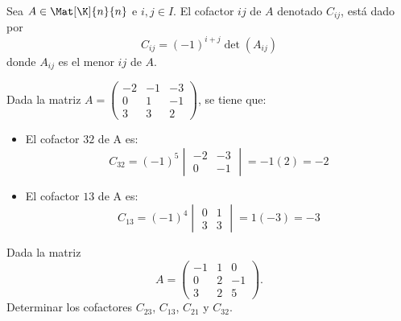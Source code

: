 \documentclass[compacto,10pt]{pubciencias-notas}
\begin{document}

\begin{defi}[Cofactor]
    Sea $A\in \Mat[\K]{n}{n}$ e $i,j\in I$. El cofactor $ij$ de $A$ denotado $C_{ij}$, está dado por
    \[
        C_{ij} = (-1)^{i+j} \det (A_{ij})
    \]
     donde $A_{ij}$ es el menor $ij$ de $A$.
\end{defi}

\begin{ejem} Dada la matriz $A = 
\begin{pmatrix}
-2 & -1 & -3 \\
0 & 1 & -1 \\
3 & 3 & 2
\end{pmatrix}$, se tiene que:
\begin{itemize}
\item El cofactor $32$ de A es:
\[C_{32} = (-1)^{5}
\begin{vmatrix}
-2 & -3 \\
0 & -1
\end{vmatrix} = -1(2)=-2\]
\item El cofactor $13$ de A es:
\[C_{13} = (-1)^{4}
\begin{vmatrix}
0 & 1 \\
3 & 3
\end{vmatrix} = 1(-3) = -3\]
\end{itemize}
\end{ejem}

\begin{ejer}\hspace{0pt} Dada la matriz 
\[
    A = 
    \begin{pmatrix}
        -1 & 1 & 0 \\
        0 & 2 & -1 \\
        3 & 2 & 5
    \end{pmatrix}.
\]
Determinar los cofactores $C_{23}$, $C_{13}$, $C_{21}$ y $C_{32}$.
\end{ejer}
\end{document}
